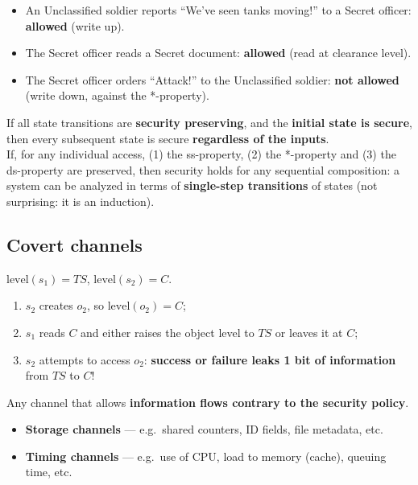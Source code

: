 \begin{exbox}[title=BLP in the army]
\begin{itemize}
  \item An Unclassified soldier reports ``We've seen tanks moving!'' to a Secret
        officer: \textbf{allowed} (write up).
  \item The Secret officer reads a Secret document: \textbf{allowed} (read at clearance
        level).
  \item The Secret officer orders ``Attack!'' to the Unclassified soldier: \textbf{not
        allowed} (write down, against the *-property).
\end{itemize}
\end{exbox}

\begin{thmbox}[title=Basic Security Theorem]
If all state transitions are \textbf{security preserving}, and the \textbf{initial state
is secure}, then every subsequent state is secure \textbf{regardless of the inputs}. \\
If, for any individual access, (1) the ss-property, (2) the *-property and (3) the
ds-property are preserved, then security holds for any sequential composition: a
system can be analyzed in terms of \textbf{single-step transitions} of states (not
surprising: it is an induction).
\end{thmbox}

\subsection{Covert channels}

\begin{exbox}[title={What are the transitions, and what does ``read'' mean?}]
$\text{level}(s_1) = TS$, $\text{level}(s_2) = C$.
\begin{enumerate}
  \item $s_2$ creates $o_2$, so $\text{level}(o_2) = C$;
  \item $s_1$ reads $C$ and either raises the object level to $TS$ or leaves it at $C$;
  \item $s_2$ attempts to access $o_2$: \textbf{success or failure leaks 1 bit of
        information} from $TS$ to $C$!
\end{enumerate}
\end{exbox}

\begin{defnbox}[title=Covert channel]
Any channel that allows \textbf{information flows contrary to the security policy}.
\begin{itemize}
  \item \textbf{Storage channels} --- e.g.\ shared counters, ID fields, file
        metadata, etc.
  \item \textbf{Timing channels} --- e.g.\ use of CPU, load to memory (cache), queuing
        time, etc.
\end{itemize}
\end{defnbox}

